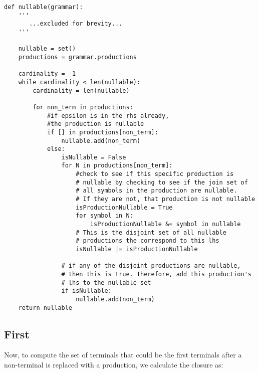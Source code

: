 \documentclass{article}
\begin{document}
\begin{verbatim}
def nullable(grammar):
    '''
       ...excluded for brevity...
    '''
    
    nullable = set()
    productions = grammar.productions

    cardinality = -1
    while cardinality < len(nullable):
        cardinality = len(nullable)

        for non_term in productions:
            #if epsilon is in the rhs already,
            #the production is nullable
            if [] in productions[non_term]:
                nullable.add(non_term)
            else:
                isNullable = False
                for N in productions[non_term]:
                    #check to see if this specific production is
                    # nullable by checking to see if the join set of
                    # all symbols in the production are nullable.
                    # If they are not, that production is not nullable
                    isProductionNullable = True
                    for symbol in N:
                        isProductionNullable &= symbol in nullable
                    # This is the disjoint set of all nullable
                    # productions the correspond to this lhs
                    isNullable |= isProductionNullable

                # if any of the disjoint productions are nullable, 
                # then this is true. Therefore, add this production's
                # lhs to the nullable set
                if isNullable:
                    nullable.add(non_term)
    return nullable
\end{verbatim}
\label{exerpt:nullable}

\subsection{First} Now, to compute the set of terminals that could be
the first terminals after a non-terminal is replaced with a
production, we calculate the closure as:
\end{document}
